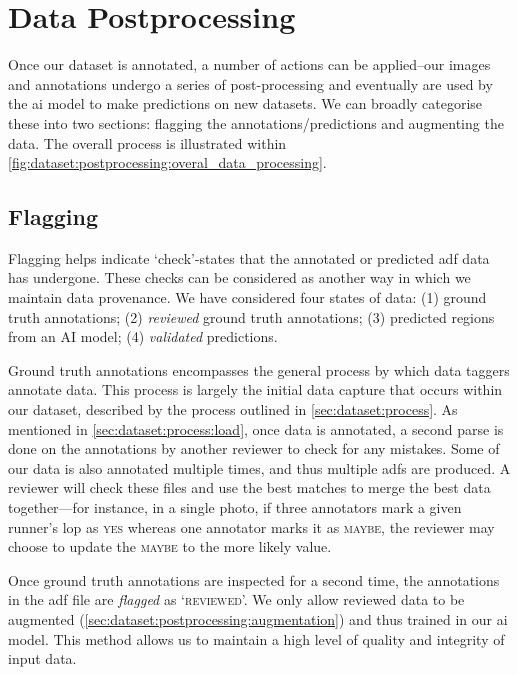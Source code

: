 \section{Data Postprocessing}
\label{sec:dataset:postprocessing}

Once our dataset is annotated, a number of actions can be applied--our images and annotations undergo a series of post-processing and eventually are used by the \gls{ai} model to make predictions on new datasets. We can broadly categorise these into two sections: flagging the annotations/predictions and augmenting the data. The overall process is illustrated within \cref{fig:dataset:postprocessing:overal_data_processing}.

\subsection{Flagging}
\label{sec:dataset:postprocessing:flagging}

Flagging helps indicate `check'-states that the annotated or predicted \gls{adf} data has undergone. These checks can be considered as another way in which we maintain data provenance. We have considered four states of data: (1) ground truth annotations; (2) \textit{reviewed} ground truth annotations; (3) predicted regions from an AI model; (4) \textit{validated} predictions.

Ground truth annotations encompasses the general process by which data taggers annotate data. This process is largely the initial data capture that occurs within our dataset, described by the process outlined in \cref{sec:dataset:process}. As mentioned in \cref{sec:dataset:process:load}, once data is annotated, a second parse is done on the annotations by another reviewer to check for any mistakes. Some of our data is also annotated multiple times, and thus multiple \glspl{adf} are produced. A reviewer will check these files and use the best matches to merge the best data together---for instance, in a single photo, if three annotators mark a given runner's \gls{lop} as \textsc{yes} whereas one annotator marks it as \textsc{maybe}, the reviewer may choose to update the \textsc{maybe} to the more likely value.

Once ground truth annotations are inspected for a second time, the annotations in the \gls{adf} file are \textit{flagged} as `\textsc{reviewed}'. We only allow reviewed data to be augmented (\cref{sec:dataset:postprocessing:augmentation}) and thus trained in our \gls{ai} model. This method allows us to maintain a high level of quality and integrity of input data.

